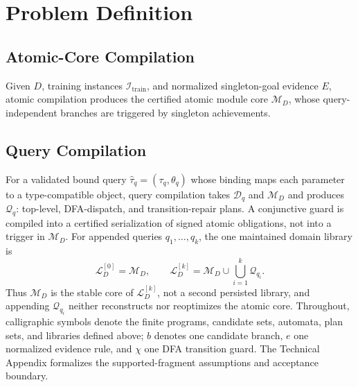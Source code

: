 \section{Problem Definition}
\label{sec:problem-definition}

\subsection{Atomic-Core Compilation}

Given $D$, training instances $\mathcal{I}_{\mathrm{train}}$, and normalized
singleton-goal evidence $E$, atomic compilation produces the certified atomic
module core $\mathcal{M}_D$, whose query-independent branches are triggered by
singleton achievements.

\subsection{Query Compilation}

For a validated bound query
$\widehat\tau_q=(\tau_q,\theta_q)$ whose binding maps each parameter to a
type-compatible object, query compilation takes $\mathcal D_q$ and
$\mathcal M_D$ and produces $\mathcal Q_q$: top-level, DFA-dispatch, and
transition-repair plans. A conjunctive guard is compiled into a certified
serialization of signed atomic obligations, not into a trigger in
$\mathcal M_D$. For appended queries $q_1,\ldots,q_k$, the one maintained domain
library is
\[
\mathcal{L}_D^{[0]}=\mathcal{M}_D,
\qquad
\mathcal{L}_D^{[k]}=
\mathcal{M}_D\cup\bigcup_{i=1}^{k}\mathcal{Q}_{q_i}.
\]
Thus $\mathcal M_D$ is the stable core of $\mathcal L_D^{[k]}$, not a
second persisted library, and appending $\mathcal Q_{q_i}$ neither reconstructs
nor reoptimizes the atomic core. Throughout, calligraphic symbols denote the
finite programs, candidate sets, automata, plan sets, and libraries defined
above; $b$ denotes one candidate branch, $e$ one normalized evidence rule, and
$\chi$ one DFA transition guard. The Technical Appendix formalizes the
supported-fragment assumptions and acceptance boundary.

